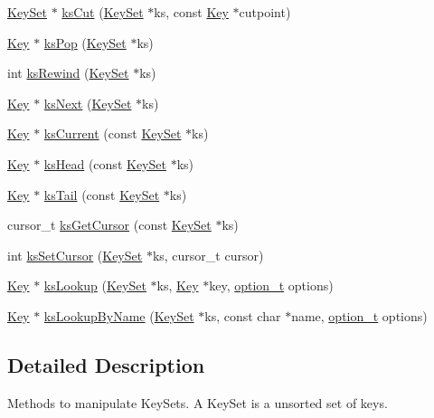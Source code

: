 \begin{DoxyCompactItemize}
\item 
\hyperlink{struct__KeySet}{KeySet} $\ast$ \hyperlink{group__keyset_ga6b00cf82b59af4d883a9bad6cf4a4a4a}{ksCut} (\hyperlink{struct__KeySet}{KeySet} $\ast$ks, const \hyperlink{struct__Key}{Key} $\ast$cutpoint)
\item 
\hyperlink{struct__Key}{Key} $\ast$ \hyperlink{group__keyset_gae42530b04defb772059de0600159cf69}{ksPop} (\hyperlink{struct__KeySet}{KeySet} $\ast$ks)
\item 
int \hyperlink{group__keyset_gabe793ff51f1728e3429c84a8a9086b70}{ksRewind} (\hyperlink{struct__KeySet}{KeySet} $\ast$ks)
\item 
\hyperlink{struct__Key}{Key} $\ast$ \hyperlink{group__keyset_ga317321c9065b5a4b3e33fe1c399bcec9}{ksNext} (\hyperlink{struct__KeySet}{KeySet} $\ast$ks)
\item 
\hyperlink{struct__Key}{Key} $\ast$ \hyperlink{group__keyset_ga4287b9416912c5f2ab9c195cb74fb094}{ksCurrent} (const \hyperlink{struct__KeySet}{KeySet} $\ast$ks)
\item 
\hyperlink{struct__Key}{Key} $\ast$ \hyperlink{group__keyset_gae7dbf3aef70e67b5328475eb3d1f92f5}{ksHead} (const \hyperlink{struct__KeySet}{KeySet} $\ast$ks)
\item 
\hyperlink{struct__Key}{Key} $\ast$ \hyperlink{group__keyset_gadca442c4ab43cf532b15091d7711559e}{ksTail} (const \hyperlink{struct__KeySet}{KeySet} $\ast$ks)
\item 
cursor\_\-t \hyperlink{group__keyset_gaffe507ab9281c322eb16c3e992075d29}{ksGetCursor} (const \hyperlink{struct__KeySet}{KeySet} $\ast$ks)
\item 
int \hyperlink{group__keyset_gad94c9ffaa3e8034564c0712fd407c345}{ksSetCursor} (\hyperlink{struct__KeySet}{KeySet} $\ast$ks, cursor\_\-t cursor)
\item 
\hyperlink{struct__Key}{Key} $\ast$ \hyperlink{group__keyset_gaa34fc43a081e6b01e4120daa6c112004}{ksLookup} (\hyperlink{struct__KeySet}{KeySet} $\ast$ks, \hyperlink{struct__Key}{Key} $\ast$key, \hyperlink{group__kdb_ga98a3d6a4016c9dad9cbd1a99a9c2a45a}{option\_\-t} options)
\item 
\hyperlink{struct__Key}{Key} $\ast$ \hyperlink{group__keyset_gad2e30fb6d4739d917c5abb2ac2f9c1a1}{ksLookupByName} (\hyperlink{struct__KeySet}{KeySet} $\ast$ks, const char $\ast$name, \hyperlink{group__kdb_ga98a3d6a4016c9dad9cbd1a99a9c2a45a}{option\_\-t} options)
\end{DoxyCompactItemize}


\subsection{Detailed Description}
Methods to manipulate KeySets. A KeySet is a unsorted set of keys.

